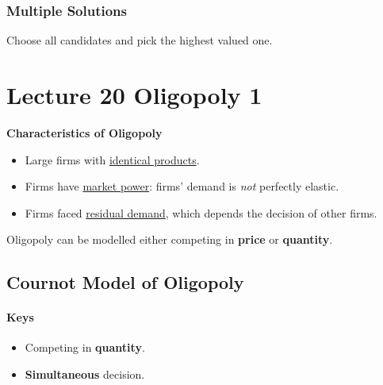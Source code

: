 \documentclass[]{article}
\begin{document}
            \subsubsection{Multiple Solutions}
                \par Choose all candidates and pick the highest valued one.
        
    
    
    \section{Lecture 20 Oligopoly 1}
        \begin{remark}
            \textbf{Characteristics of Oligopoly}
            \begin{itemize}
                \item Large firms with \ul{identical products}.
                \item Firms have \ul{market power}: firms' demand is \emph{not} perfectly elastic.
                \item Firms faced \ul{residual demand}, which depends the decision of other firms.
            \end{itemize}
        \end{remark}
        
        \begin{remark}
            Oligopoly can be modelled either competing in \textbf{price} or \textbf{quantity}.
        \end{remark}
        
        \subsection{Cournot Model of Oligopoly}
            \paragraph{Keys}
                \begin{itemize}
                    \item Competing in \textbf{quantity}.
                    \item \textbf{Simultaneous} decision.
                \end{itemize}
                
\end{document}
